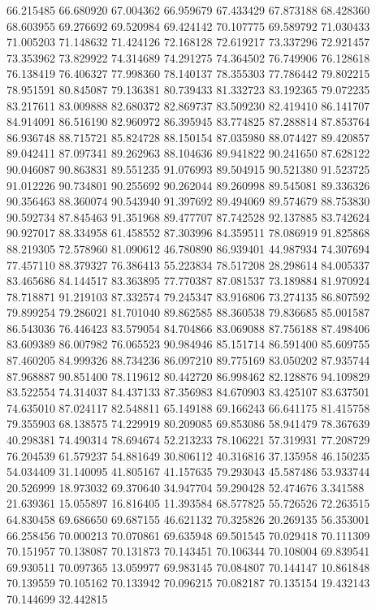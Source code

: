 66.215485
66.680920
67.004362
66.959679
67.433429
67.873188
68.428360
68.603955
69.276692
69.520984
69.424142
70.107775
69.589792
71.030433
71.005203
71.148632
71.424126
72.168128
72.619217
73.337296
72.921457
73.353962
73.829922
74.314689
74.291275
74.364502
76.749906
76.128618
76.138419
76.406327
77.998360
78.140137
78.355303
77.786442
79.802215
78.951591
80.845087
79.136381
80.739433
81.332723
83.192365
79.072235
83.217611
83.009888
82.680372
82.869737
83.509230
82.419410
86.141707
84.914091
86.516190
82.960972
86.395945
83.774825
87.288814
87.853764
86.936748
88.715721
85.824728
88.150154
87.035980
88.074427
89.420857
89.042411
87.097341
89.262963
88.104636
89.941822
90.241650
87.628122
90.046087
90.863831
89.551235
91.076993
89.504915
90.521380
91.523725
91.012226
90.734801
90.255692
90.262044
89.260998
89.545081
89.336326
90.356463
88.360074
90.543940
91.397692
89.494069
89.574679
88.753830
90.592734
87.845463
91.351968
89.477707
87.742528
92.137885
83.742624
90.927017
88.334958
61.458552
87.303996
84.359511
78.086919
91.825868
88.219305
72.578960
81.090612
46.780890
86.939401
44.987934
74.307694
77.457110
88.379327
76.386413
55.223834
78.517208
28.298614
84.005337
83.465686
84.144517
83.363895
77.770387
87.081537
73.189884
81.970924
78.718871
91.219103
87.332574
79.245347
83.916806
73.274135
86.807592
79.899254
79.286021
81.701040
89.862585
88.360538
79.836685
85.001587
86.543036
76.446423
83.579054
84.704866
83.069088
87.756188
87.498406
83.609389
86.007982
76.065523
90.984946
85.151714
86.591400
85.609755
87.460205
84.999326
88.734236
86.097210
89.775169
83.050202
87.935744
87.968887
90.851400
78.119612
80.442720
86.998462
82.128876
94.109829
83.522554
74.314037
84.437133
87.356983
84.670903
83.425107
83.637501
74.635010
87.024117
82.548811
65.149188
69.166243
66.641175
81.415758
79.355903
68.138575
74.229919
80.209085
69.853086
58.941479
78.367639
40.298381
74.490314
78.694674
52.213233
78.106221
57.319931
77.208729
76.204539
61.579237
54.881649
30.806112
40.316816
37.135958
46.150235
54.034409
31.140095
41.805167
41.157635
79.293043
45.587486
53.933744
20.526999
18.973032
69.370640
34.947704
59.290428
52.474676
3.341588
21.639361
15.055897
16.816405
11.393584
68.577825
55.726526
72.263515
64.830458
69.686650
69.687155
46.621132
70.325826
20.269135
56.353001
66.258456
70.000213
70.070861
69.635948
69.501545
70.029418
70.111309
70.151957
70.138087
70.131873
70.143451
70.106344
70.108004
69.839541
69.930511
70.097365
13.059977
69.983145
70.084807
70.144147
10.861848
70.139559
70.105162
70.133942
70.096215
70.082187
70.135154
19.432143
70.144699
32.442815
